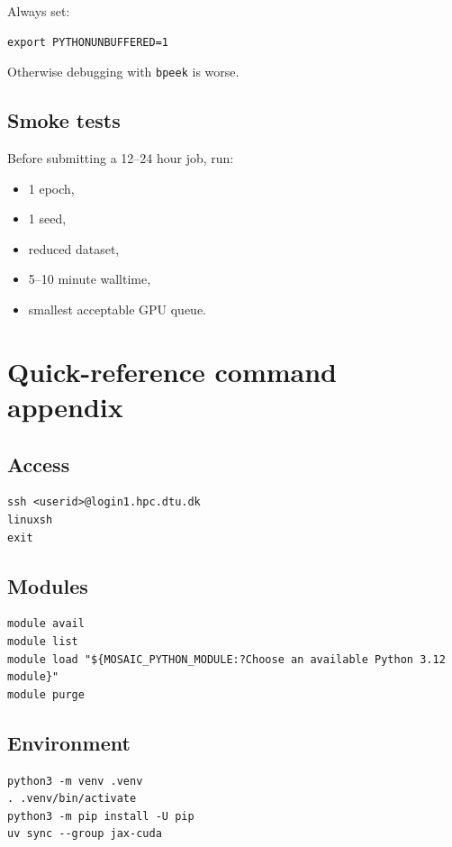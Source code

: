 \documentclass[11pt,a4paper]{article}
\begin{document}
Always set:

\begin{lstlisting}[style=shell]
export PYTHONUNBUFFERED=1
\end{lstlisting}

Otherwise debugging with \texttt{bpeek} is worse.

\subsection{Smoke tests}

Before submitting a 12--24 hour job, run:

\begin{itemize}[leftmargin=1.5em]
  \item 1 epoch,
  \item 1 seed,
  \item reduced dataset,
  \item 5--10 minute walltime,
  \item smallest acceptable GPU queue.
\end{itemize}

\section{Quick-reference command appendix}

\subsection{Access}

\begin{lstlisting}[style=shell]
ssh <userid>@login1.hpc.dtu.dk
linuxsh
exit
\end{lstlisting}

\subsection{Modules}

\begin{lstlisting}[style=shell]
module avail
module list
module load "${MOSAIC_PYTHON_MODULE:?Choose an available Python 3.12 module}"
module purge
\end{lstlisting}

\subsection{Environment}

\begin{lstlisting}[style=shell]
python3 -m venv .venv
. .venv/bin/activate
python3 -m pip install -U pip
uv sync --group jax-cuda
\end{lstlisting}
\end{document}
